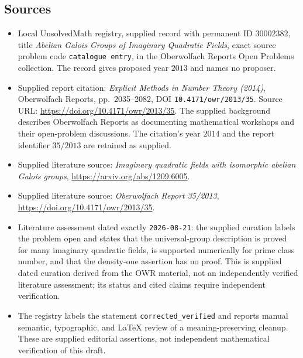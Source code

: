\documentclass[11pt]{article}
\begin{document}
\subsection{Sources}
\begin{itemize}
\item Local UnsolvedMath registry, supplied record with permanent ID \(30002382\), title \emph{Abelian Galois Groups of Imaginary Quadratic Fields}, exact source problem code \texttt{catalogue entry}, in the Oberwolfach Reports Open Problems collection. The record gives proposed year \(2013\) and names no proposer.
\item Supplied report citation: \emph{Explicit Methods in Number Theory (2014)}, Oberwolfach Reports, pp.\ 2035--2082, DOI \texttt{10.4171/owr/2013/35}. Source URL: \url{https://doi.org/10.4171/owr/2013/35}. The supplied background describes Oberwolfach Reports as documenting mathematical workshops and their open-problem discussions. The citation's year \(2014\) and the report identifier \(35/2013\) are retained as supplied.
\item Supplied literature source: \emph{Imaginary quadratic fields with isomorphic abelian Galois groups}, \url{https://arxiv.org/abs/1209.6005}.
\item Supplied literature source: \emph{Oberwolfach Report 35/2013}, \url{https://doi.org/10.4171/owr/2013/35}.
\item Literature assessment dated exactly \texttt{2026-08-21}: the supplied curation labels the problem open and states that the universal-group description is proved for many imaginary quadratic fields, is supported numerically for prime class number, and that the density-one assertion has no proof. This is supplied dated curation derived from the OWR material, not an independently verified literature assessment; its status and cited claims require independent verification.
\item The registry labels the statement \texttt{corrected\_verified} and reports manual semantic, typographic, and LaTeX review of a meaning-preserving cleanup. These are supplied editorial assertions, not independent mathematical verification of this draft.
\end{itemize}
\end{document}
